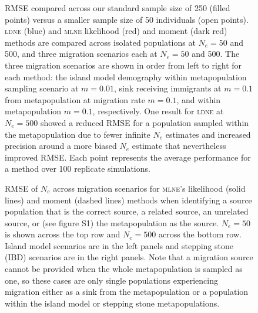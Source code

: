 \begin{figure}[ht]
\centering
{}
\caption[ ~~~ - RMSE compared across sample sizes.]{RMSE compared across our standard sample size of 250 (filled points) versus a smaller sample size of 50 individuals (open points). \textsc{ldne} (blue) and \textsc{mlne} likelihood (red) and moment (dark red) methods are compared across isolated populations at $N_e = 50$ and 500, and three migration scenarios each at $N_e = 50$ and 500. The three migration scenarios are shown in order from left to right for each method: the island model demography within metapopulation sampling scenario at $m = 0.01$, sink receiving immigrants at $m = 0.1$ from metapopulation at migration rate $m = 0.1$, and within metapopulation $m = 0.1$, respectively. One result for \textsc{ldne} at $N_e = 500$ showed a reduced RMSE for a population sampled within the metapopulation due to fewer infinite $N_e$ estimates and increased precision around a more biased $N_e$ estimate that nevertheless improved RMSE. Each point represents the average performance for a method over 100 replicate simulations.}
\label{fig:supp_rmsesamp}
\end{figure}


\begin{figure}[ht]
\centering
{}
\caption[ ~~~ - RMSE of $N_e$ across migration scenarios.]{RMSE of $N_e$ across migration scenarios for \textsc{mlne}'s likelihood (solid lines) and moment (dashed lines) methods when identifying a source population that is the correct source, a related source, an unrelated source, or (see figure S1) the metapopulation as the source. $N_e = 50$ is shown across the top row and $N_e = 500$ across the bottom row. Island model scenarios are in the left panels and stepping stone (IBD) scenarios are in the right panels. Note that a migration source cannot be provided when the whole metapopulation is sampled as one, so these cases are only single populations experiencing migration either as a sink from the metapopulation or a population within the island model or stepping stone metapopulations.}
\label{fig:supp_rmsemig}
\end{figure}


